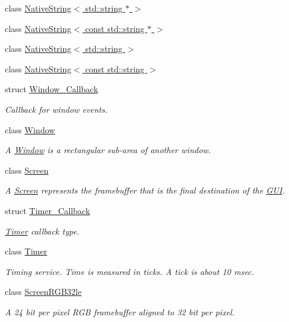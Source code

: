 \begin{DoxyCompactItemize}
class \hyperlink{classGUI_1_1NativeString_3_01std_1_1string_01_5_01_4}{Native\-String$<$ std\-::string $\ast$ $>$}
\item 
class \hyperlink{classGUI_1_1NativeString_3_01const_01std_1_1string_01_5_01_4}{Native\-String$<$ const std\-::string $\ast$ $>$}
\item 
class \hyperlink{classGUI_1_1NativeString_3_01std_1_1string_01_4}{Native\-String$<$ std\-::string $>$}
\item 
class \hyperlink{classGUI_1_1NativeString_3_01const_01std_1_1string_01_4}{Native\-String$<$ const std\-::string $>$}
\item 
struct \hyperlink{structGUI_1_1Window__Callback}{Window\-\_\-\-Callback}
\begin{DoxyCompactList}\small\item\em Callback for window events. \end{DoxyCompactList}\item 
class \hyperlink{classGUI_1_1Window}{Window}
\begin{DoxyCompactList}\small\item\em A \hyperlink{classGUI_1_1Window}{Window} is a rectangular sub-\/area of another window. \end{DoxyCompactList}\item 
class \hyperlink{classGUI_1_1Screen}{Screen}
\begin{DoxyCompactList}\small\item\em A \hyperlink{classGUI_1_1Screen}{Screen} represents the framebuffer that is the final destination of the \hyperlink{namespaceGUI}{G\-U\-I}. \end{DoxyCompactList}\item 
struct \hyperlink{structGUI_1_1Timer__Callback}{Timer\-\_\-\-Callback}
\begin{DoxyCompactList}\small\item\em \hyperlink{classGUI_1_1Timer}{Timer} callback type. \end{DoxyCompactList}\item 
class \hyperlink{classGUI_1_1Timer}{Timer}
\begin{DoxyCompactList}\small\item\em Timing service. Time is measured in ticks. A tick is about 10 msec. \end{DoxyCompactList}\item 
class \hyperlink{classGUI_1_1ScreenRGB32le}{Screen\-R\-G\-B32le}
\begin{DoxyCompactList}\small\item\em A 24 bit per pixel R\-G\-B framebuffer aligned to 32 bit per pixel. \end{DoxyCompactList}\item 

\end{DoxyCompactItemize}
